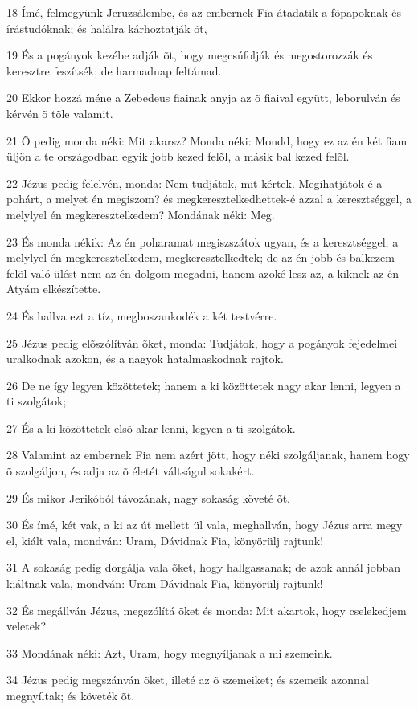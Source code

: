 \par 18 Ímé, felmegyünk Jeruzsálembe, és az embernek Fia átadatik a fõpapoknak és írástudóknak; és halálra kárhoztatják õt,
\par 19 És a pogányok kezébe adják õt, hogy megcsúfolják és megostorozzák és keresztre feszítsék; de harmadnap feltámad.
\par 20 Ekkor hozzá méne a Zebedeus fiainak anyja az õ fiaival együtt, leborulván és kérvén õ tõle valamit.
\par 21 Õ pedig monda néki: Mit akarsz? Monda néki: Mondd, hogy ez az én két fiam üljön a te országodban egyik jobb kezed felõl, a másik bal kezed felõl.
\par 22 Jézus pedig felelvén, monda: Nem tudjátok, mit kértek. Megihatjátok-é a pohárt, a melyet én megiszom? és megkeresztelkedhettek-é azzal  a keresztséggel, a melylyel én megkeresztelkedem? Mondának néki: Meg.
\par 23 És monda nékik: Az én poharamat megiszszátok ugyan, és a keresztséggel, a melylyel én megkeresztelkedem, megkeresztelkedtek; de az én jobb és balkezem felõl való ülést nem az én dolgom megadni, hanem azoké lesz az, a kiknek az én Atyám elkészítette.
\par 24 És hallva ezt a tíz, megboszankodék a két testvérre.
\par 25 Jézus pedig elõszólítván õket, monda: Tudjátok, hogy a pogányok fejedelmei uralkodnak azokon, és a nagyok hatalmaskodnak rajtok.
\par 26 De ne így legyen közöttetek; hanem a ki közöttetek nagy akar lenni, legyen a ti szolgátok;
\par 27 És a ki közöttetek elsõ akar lenni, legyen a ti szolgátok.
\par 28 Valamint az embernek Fia nem azért jött, hogy néki szolgáljanak, hanem hogy õ szolgáljon, és adja az õ életét  váltságul sokakért.
\par 29 És mikor Jerikóból távozának, nagy sokaság követé õt.
\par 30 És ímé, két vak, a ki az út mellett ül vala, meghallván, hogy Jézus arra megy el, kiált vala, mondván: Uram, Dávidnak Fia, könyörülj rajtunk!
\par 31 A sokaság pedig dorgálja vala õket, hogy hallgassanak; de azok annál jobban kiáltnak vala, mondván: Uram Dávidnak Fia, könyörülj rajtunk!
\par 32 És megállván Jézus, megszólítá õket és monda: Mit akartok, hogy cselekedjem veletek?
\par 33 Mondának néki: Azt, Uram, hogy megnyíljanak a mi szemeink.
\par 34 Jézus pedig megszánván õket, illeté az õ szemeiket; és szemeik azonnal megnyíltak; és követék õt.

